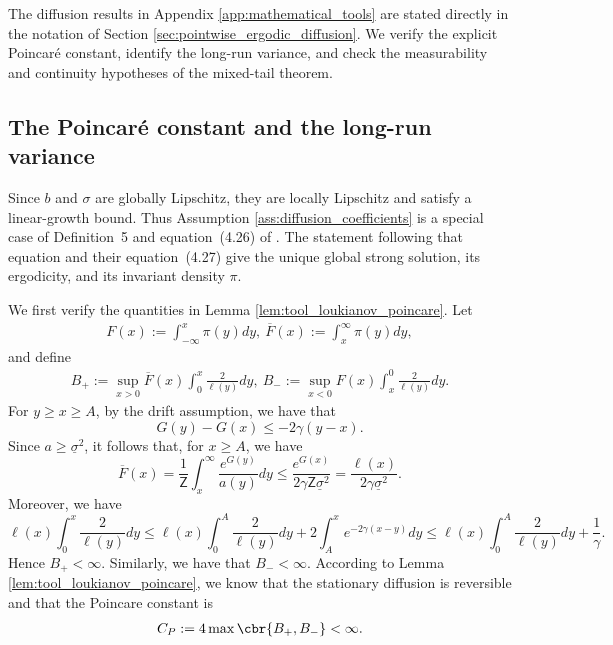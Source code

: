 \documentclass[11pt]{article}
\begin{document}
The diffusion results in Appendix \ref{app:mathematical_tools} are stated
directly in the notation of Section
\ref{sec:pointwise_ergodic_diffusion}. We verify the explicit Poincar\'e
constant, identify the long-run variance, and check the measurability and
continuity hypotheses of the mixed-tail theorem.

\subsection{The Poincar\'e constant and the long-run variance}

Since $b$ and $\sigma$ are globally Lipschitz, they are locally Lipschitz
and satisfy a linear-growth bound. Thus Assumption
\ref{ass:diffusion_coefficients} is a special case of Definition~5 and
equation~(4.26) of \citet{aeckerle2021concentration}. The statement
following that equation and their equation~(4.27) give the unique global
strong solution, its ergodicity, and its invariant density $\pi$.

We first verify the quantities in Lemma
\ref{lem:tool_loukianov_poincare}. Let
\begin{align*}
F(x):=
\int_{-\infty}^x\pi(y)dy,\ 
\overline F(x):=
\int_x^\infty\pi(y)dy,
\end{align*}
and define
\begin{align*}
B_+:=
\sup_{x>0}
\overline F(x)
\int_0^x\frac{2}{\ell(y)}dy,\ 
B_-:=
\sup_{x<0}
F(x)
\int_x^0\frac{2}{\ell(y)}dy.
\end{align*}
For $y\ge x\ge A$, by the drift assumption, we have that
\begin{equation}
G(y)-G(x)\le-2\gamma(y-x).
\label{eq:diffusion_G_right}
\end{equation}
Since $a\ge\underline\sigma^2$, it follows that, for $x\ge A$, we have
\begin{equation}\label{eq:diffusion_tail_ratio}
\overline F(x)=
\frac1{\mathsf Z}
\int_x^\infty\frac{e^{G(y)}}{a(y)}dy\le
\frac{e^{G(x)}}{2\gamma\mathsf Z\underline\sigma^2}=\frac{\ell(x)}{2\gamma\underline\sigma^2}.
\end{equation}
Moreover, we have
\begin{equation*}
\ell(x)
\int_0^x\frac{2}{\ell(y)}dy\le
\ell(x)
\int_0^A\frac{2}{\ell(y)}dy+2\int_A^x e^{-2\gamma(x-y)}dy\le
\ell(x)
\int_0^A\frac{2}{\ell(y)}dy
+
\frac1\gamma.
\end{equation*}
Hence $B_+<\infty$. Similarly, we have that $B_-<\infty$. According to Lemma \ref{lem:tool_loukianov_poincare}, we know that the stationary
diffusion is reversible and that the Poincare constant is
\begin{align}
C_P
:=
4\max\cbr{B_+,B_-}
<\infty
\label{eq:diffusion_explicit_CP}.
\end{align}
\end{document}

